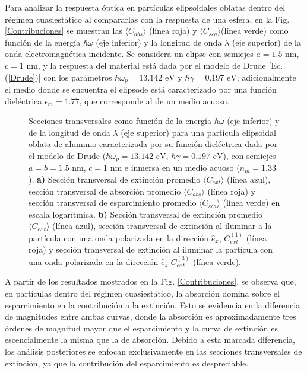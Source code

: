 Para analizar la respuesta óptica en partículas elipsoidales oblatas dentro del régimen cuasiestático al compararlas con la respuesta de una esfera, en la Fig. \ref{Contribuciones} se muestran las $\langle C_{abs} \rangle$ (línea roja) y $\langle C_{sca} \rangle$(línea verde) como función de la energía $\hbar\omega$ (eje inferior) y la longitud de onda $\lambda$ (eje superior) de la onda electromagnética incidente. Se considera un elipse con semiejes $a=1.5\text{ nm}$, $c=1\text{ nm}$, y la respuesta del material está dada por el modelo de Drude [Ec. (\ref{Drude})] con los parámetros $\hbar\omega_p=13.142\text{ eV}$ y $\hbar\gamma=0.197\text{ eV}$; adicionalmente el medio donde se encuentra el elipsode está caracterizado por una función dieléctrica $\epsilon_m=1.77$, que corresponde al de un medio acuoso.\\
\begin{figure}[h!]
	\quad%
	\caption{Secciones transversales como función de la energía $\hbar\omega$ (eje inferior) y de la longitud de onda $\lambda$ (eje superior) para una partícula elipsoidal oblata de aluminio caracterizada por su función dieléctrica dada por el modelo de Drude ($\hbar\omega_p=13.142\text{ eV}$, $\hbar\gamma=0.197\text{ eV}$), con semiejes $a=b=1.5\text{ nm}$, $c=1\text{ nm}$ e inmersa en un medio acuoso ($n_m=1.33$). \textbf{a)}  Sección transversal de extinción promedio $\langle C_{ext}\rangle$  (línea azul), sección transversal de absorción promedio $\langle C_{abs}\rangle$  (línea roja) y sección transversal de esparcimiento promedio $\langle C_{sca}\rangle$  (línea verde) en escala logarítmica. \textbf{b)} Sección transversal de extinción promedio $\langle C_{ext}\rangle$ (línea azul), sección transversal de extinción al iluminar a la partícula con una onda polarizada en la dirección $\hat{e}_x$, $C_{ext}^{(1)}$  (línea roja)  y sección transversal de extinción al iluminar la partícula con una onda polarizada en la dirección $\hat{e}_z$ $C_{ext}^{(3)}$  (línea verde).} \label{fig:test}
\end{figure}

A partir de los resultados mostrados en la Fig. \ref{Contribuciones}, se observa que, en partículas dentro del régimen cuasiestático, la absorción domina sobre el esparcimiento en la contribución a la extinción. Esto se evidencia en la diferencia de magnitudes entre ambas curvas, donde la absorción es aproximadamente tres órdenes de magnitud mayor que el esparcimiento y la curva de extinción es escencialmente la misma que la de absorción. Debido a esta marcada diferencia, los análisis posteriores se enfocan exclusivamente en las secciones transversales de extinción, ya que la contribución del esparcimiento es despreciable.\\

